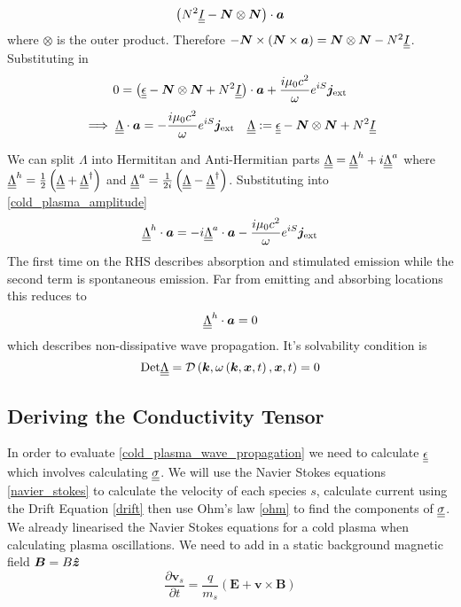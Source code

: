 \begin{equation}
	\left( N^2 \underline{\underline{I}} - \bm{N} \otimes \bm{N} \right) \cdot \bm{a}
\end{equation}
where $\otimes$ is the outer product. Therefore $-\bm{N} \times \left( \bm{N} \times \bm{a} \right) = \bm{N} \otimes \bm{N} - N^2 \underline{\underline{I}}$. Substituting in
\begin{equation*}
	0 = \left( \underline{\underline{\epsilon}} - \bm{N} \otimes \bm{N} + N^2 \underline{\underline{I}} \right) \cdot \bm{a} + \frac{i \mu_0 c^2}{\omega} e^{iS} \bm{j}_{\text{ext}}
\end{equation*}
\begin{equation}\label{cold_plasma_lambda}
	\implies \underline{\underline{\Lambda}} \cdot \bm{a} = - \frac{i \mu_0 c^2}{\omega} e^{iS} \bm{j}_{\text{ext}} \quad \underline{\underline{\Lambda}} := \underline{\underline{\epsilon}} - \bm{N} \otimes \bm{N} + N^2 \underline{\underline{I}}
\end{equation}

We can split $\Lambda$ into Hermititan and Anti-Hermitian parts $\underline{\underline{\Lambda}} = \underline{\underline{\Lambda}}^h + i \underline{\underline{\Lambda}}^a$ where $\underline{\underline{\Lambda}}^h = \frac{1}{2} \left( \underline{\underline{\Lambda}} + \underline{\underline{\Lambda}}^{\dagger} \right)$ and $\underline{\underline{\Lambda}}^a = \frac{1}{2i} \left( \underline{\underline{\Lambda}} - \underline{\underline{\Lambda}}^{\dagger} \right)$. Substituting into \eqref{cold_plasma_amplitude}
\begin{equation}
	\underline{\underline{\Lambda}}^h \cdot \bm{a} = -i \underline{\underline{\Lambda}}^a \cdot \bm{a} - \frac{i \mu_0 c^2}{\omega} e^{iS} \bm{j}_{\text{ext}}
\end{equation}
The first time on the RHS describes absorption and stimulated emission while the second term is spontaneous emission. Far from emitting and absorbing locations this reduces to
\begin{equation}\label{cold_plasma_wave_propagation}
	\underline{\underline{\Lambda}}^h \cdot \bm{a} = 0
\end{equation}
which describes non-dissipative wave propagation. It's solvability condition is
\begin{equation}
	\text{Det}\underline{\underline{\Lambda}} = \mathcal{D} \left( \bm{k}, \omega \left( \bm{k}, \bm{x}, t \right), \bm{x}, t \right) = 0
\end{equation}

\subsection{Deriving the Conductivity Tensor}
In order to evaluate \eqref{cold_plasma_wave_propagation} we need to calculate $\underline{\underline{\epsilon}}$ which involves calculating $\underline{\underline{\sigma}}$. We will use the Navier Stokes equations \eqref{navier_stokes} to calculate the velocity of each species $s$, calculate current using the Drift Equation \eqref{drift} then use Ohm's law \eqref{ohm} to find the components of $\underline{\underline{\sigma}}$. We already linearised the Navier Stokes equations for a cold plasma when calculating plasma oscillations. We need to add in a static background magnetic field $\bm{B} = B\bm{\hat{z}}$
\begin{equation}
	\frac{\partial \bm{v}_s}{\partial t} = \frac{q}{m_s} \left( \bm{E} + \bm{v} \times \bm{B} \right)
\end{equation}

